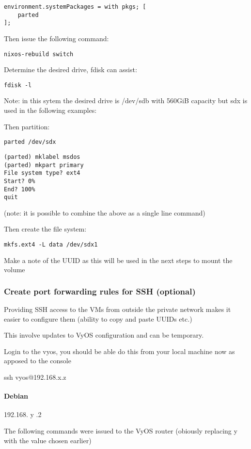 \begin{verbatim}
environment.systemPackages = with pkgs; [
    parted
];
\end{verbatim}

Then issue the following command:

\texttt{nixos-rebuild\ switch}

Determine the desired drive, fdisk can assist:

\texttt{fdisk\ -l}

Note: in this sytem the desired drive is /dev/sdb with 560GiB capacity
but sdx is used in the following examples:

Then partition:

\texttt{parted\ /dev/sdx}

\begin{verbatim}
(parted) mklabel msdos
(parted) mkpart primary
File system type? ext4
Start? 0%
End? 100%
quit
\end{verbatim}

(note: it is possible to combine the above as a single line command)

Then create the file system:

\texttt{mkfs.ext4\ -L\ data\ /dev/sdx1}

Make a note of the UUID as this will be used in the next steps to mount
the volume

\hypertarget{create-port-forwarding-rules-for-ssh-optional}{%
\subsubsection{Create port forwarding rules for SSH
(optional)}\label{create-port-forwarding-rules-for-ssh-optional}}

Providing SSH access to the VMs from outside the private network makes
it easier to configure them (ability to copy and paste UUIDs etc.)

This involve updates to VyOS configuration and can be temporary.

Login to the vyos, you should be able do this from your local machine
now as apposed to the console

ssh vyos@192.168.x.z

\hypertarget{debian}{%
\paragraph{Debian}\label{debian}}

192.168. y .2

The following commands were issued to the VyOS router (obiously
replacing y with the value chosen earlier)

